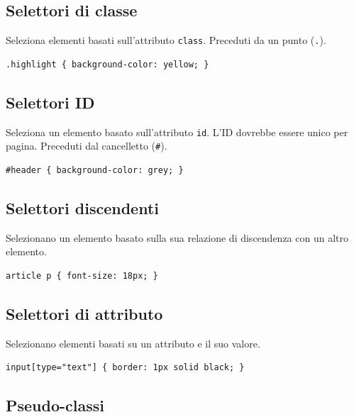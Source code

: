 \subsection{Selettori di classe}

Seleziona elementi basati sull'attributo \texttt{class}. Preceduti da un punto (\texttt{.}).

\begin{lstlisting}[caption=Selettore di classe]
.highlight { background-color: yellow; }
\end{lstlisting}

\subsection{Selettori ID}

Seleziona un elemento basato sull'attributo \texttt{id}. L'ID dovrebbe essere unico per pagina. Preceduti dal cancelletto (\texttt{\#}).

\begin{lstlisting}[caption=Selettore ID]
#header { background-color: grey; }
\end{lstlisting}

\subsection{Selettori discendenti}

Selezionano un elemento basato sulla sua relazione di discendenza con un altro elemento.

\begin{lstlisting}[caption=Selettore discendente]
article p { font-size: 18px; }
\end{lstlisting}

\subsection{Selettori di attributo}

Selezionano elementi basati su un attributo e il suo valore.

\begin{lstlisting}[caption=Selettore di attributo]
input[type="text"] { border: 1px solid black; }
\end{lstlisting}

\subsection{Pseudo-classi}

